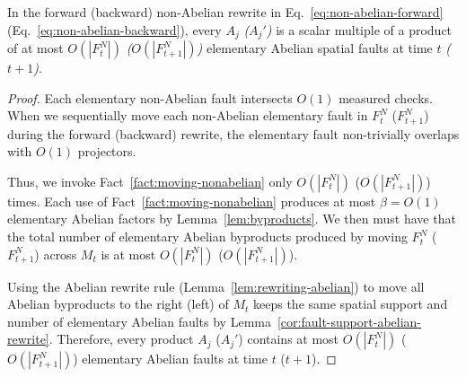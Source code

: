 \documentclass[11pt]{article}
\begin{document}
\begin{corollary}
\label{cor:fault-support-non-abelian-rewrites}
    In the forward (backward) non-Abelian rewrite in Eq.~\eqref{eq:non-abelian-forward} (Eq.~\eqref{eq:non-abelian-backward}), every $A_j$ \emph{($A_j'$)} is a scalar multiple of a product of at most $O(|F_t^N|)$ \emph{($O(|F_{t+1}^N|)$)} elementary Abelian spatial faults at time $t$ \emph{($t+1$)}.
\end{corollary}
\begin{proof}
    Each elementary non-Abelian fault intersects $O(1)$ measured checks.
    When we sequentially move each non-Abelian elementary fault in $F_t^N$ ($F_{t+1}^N$) during the forward (backward) rewrite, the elementary fault non-trivially overlaps with $O(1)$ projectors. 
    
    Thus, we invoke Fact~\ref{fact:moving-nonabelian} only $O(|F_t^N|)$ ($O(|F_{t+1}^N|)$) times.
    Each use of Fact~\ref{fact:moving-nonabelian} produces at most $\beta = O(1)$ elementary Abelian factors by Lemma~\ref{lem:byproducts}. 
    We then must have that the total number of elementary Abelian byproducts produced by moving $F_t^N$ ($F_{t+1}^N$) across $M_t$ is at most $O(|F_t^N|)$ ($O(|F_{t+1}^N|)$).
    
    Using the Abelian rewrite rule (Lemma~\ref{lem:rewriting-abelian}) to move all Abelian byproducts to the right (left) of $M_t$ keeps the same spatial support and number of elementary Abelian faults by Lemma~\ref{cor:fault-support-abelian-rewrite}. 
    Therefore, every product $A_j$ ($A_j'$) contains at most $O(|F_t^N|)$ ($O(|F_{t+1}^N|)$) elementary Abelian faults at time $t$ ($t+1$).
    
\end{proof}
\end{document}
